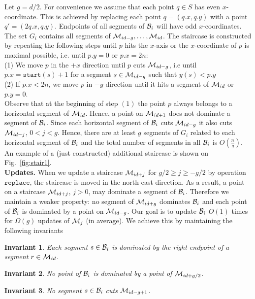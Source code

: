 \documentclass[10pt]{llncs}
\def\idtt#1{\ensuremath{\mathtt{#1}}}
\newtheorem{invariant}{Invariant}
\newcommand{\cM}{{\cal M}}
\newcommand{\cB}{{\cal B}}
\newcommand{\replace}{\idtt{replace}}
\newcommand{\sleft}{\idtt{start}}
\begin{document}
Let $g=d/2$. For convenience we assume that each point $q\in S$ has 
even $x$-coordinate. This is achieved by replacing each point 
$q=(q.x,q.y)$ with a point $q'=(2q.x,q.y)$. Endpoints of all 
segments of $\cB_i$ will have odd $x$-coordinates.
The set $G_i$ contains all  segments of 
$\cM_{id-g},\ldots,\cM_{id}$. 
The staircase is constructed by repeating the following steps 
until $p$ hits the $x$-axis or the $x$-coordinate of $p$ is maximal possible,
 i.e. until $p.y=0$ or $p.x=2n$: \\
(1) We move $p$ in the $+x$ direction until $p$ cuts $\cM_{id-g}$, 
i.e until $p.x=\sleft(s)+1$ for a segment $s\in\cM_{id-g}$ such that 
$y(s)<p.y$\\
(2) If $p.x< 2n$, we move $p$ in $-y$ direction until it hits 
a segment of $\cM_{id}$ or $p.y =0$. \\
Observe that at the beginning of step $(1)$ the point $p$ always belongs 
to a horizontal segment of $\cM_{id}$. Hence, a point on $\cM_{id+1}$ does 
not dominate a segment of $\cB_i$. 
Since each horizontal segment 
of $\cB_i$ cuts $\cM_{id-g}$ it also cuts $\cM_{id-j}$, $0< j < g$. 
Hence, there are at least $g$ segments of $G_i$ related to each horizontal 
segment of $\cB_i$ and the total number of segments in all $\cB_i$ 
is $O(\frac{n}{g})$.  
An example of 
a (just constructed) additional staircase is shown on
 Fig.~\ref{fig:stair1}. \\
{\bf Updates.} 
When we update a staircase $\cM_{id+j}$ for $g/2\geq j \geq -g/2$
 by operation $\replace$, the 
staircase is moved in the north-east direction. As a result, 
a point on a staircase $\cM_{id+j}$, $j>0$, may dominate a segment 
of $\cB_i$. Therefore  we maintain a weaker property: 
no segment of $\cM_{id+g}$ 
dominates $\cB_i$ and each point of $\cB_i$ is dominated by a 
point on $\cM_{id-g}$.   Our goal is to update $\cB_i$ 
$O(1)$ times for $\Omega(g)$ updates of $\cM_j$ (in average). 
We achieve this by maintaining the following invariants
\begin{invariant}\label{inv:dom1}
Each segment $s\in \cB_i$ is dominated by  the right endpoint of a segment 
$r\in \cM_{id}$.
\end{invariant}
\begin{invariant}\label{inv:dom2}
No point of $\cB_i$ is dominated by a point of $\cM_{id+g/2}$.
\end{invariant}
\begin{invariant}\label{inv:cut}
No segment $s\in \cB_i$ cuts $\cM_{id-g+1}$.
\end{invariant}
\end{document}
